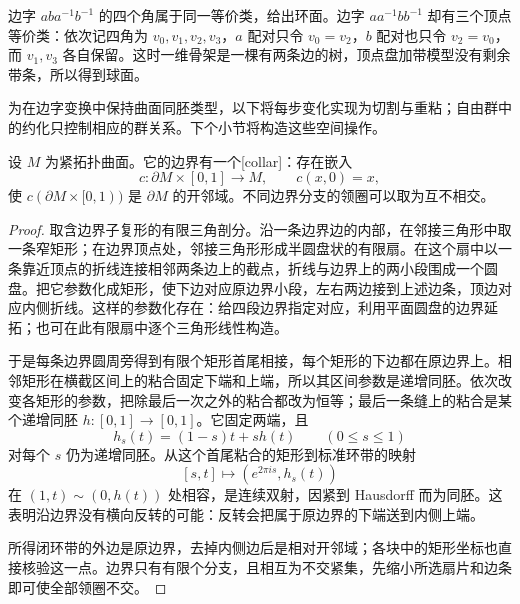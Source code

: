 \begin{example}\label{g1:ex:polygon-vertex-counts}
	边字 \(aba^{-1}b^{-1}\) 的四个角属于同一等价类，给出环面。边字 \(aa^{-1}bb^{-1}\) 却有三个顶点等价类：依次记四角为 \(v_0,v_1,v_2,v_3\)，\(a\) 配对只令 \(v_0=v_2\)，\(b\) 配对也只令 \(v_2=v_0\)，而 \(v_1,v_3\) 各自保留。这时一维骨架是一棵有两条边的树，顶点盘加带模型没有剩余带条，所以得到球面。
\end{example}

为在边字变换中保持曲面同胚类型，以下将每步变化实现为切割与重粘；自由群中的约化只控制相应的群关系。下个小节将构造这些空间操作。

\begin{proposition}\label{g1:prop:boundary-collar}
	设 \(M\) 为紧拓扑曲面。它的边界有一个[collar]：存在嵌入
	\[
		c:\partial M\times[0,1]\longrightarrow M,\qquad c(x,0)=x,
	\]
	使 \(c(\partial M\times[0,1))\) 是 \(\partial M\) 的开邻域。不同边界分支的领圈可以取为互不相交。
\end{proposition}
\begin{proof}
	取含边界子复形的有限三角剖分。沿一条边界边的内部，在邻接三角形中取一条窄矩形；在边界顶点处，邻接三角形形成半圆盘状的有限扇。在这个扇中以一条靠近顶点的折线连接相邻两条边上的截点，折线与边界上的两小段围成一个圆盘。把它参数化成矩形，使下边对应原边界小段，左右两边接到上述边条，顶边对应内侧折线。这样的参数化存在：给四段边界指定对应，利用平面圆盘的边界延拓；也可在此有限扇中逐个三角形线性构造。

	于是每条边界圆周旁得到有限个矩形首尾相接，每个矩形的下边都在原边界上。相邻矩形在横截区间上的粘合固定下端和上端，所以其区间参数是递增同胚。依次改变各矩形的参数，把除最后一次之外的粘合都改为恒等；最后一条缝上的粘合是某个递增同胚 \(h:[0,1]\to[0,1]\)。它固定两端，且
	\[
		h_s(t)=(1-s)t+s h(t)\qquad(0\le s\le1)
	\]
	对每个 \(s\) 仍为递增同胚。从这个首尾粘合的矩形到标准环带的映射
	\[
		[s,t]\longmapsto(e^{2\pi i s},h_s(t))
	\]
	在 \((1,t)\sim(0,h(t))\) 处相容，是连续双射，因紧到 Hausdorff 而为同胚。这表明沿边界没有横向反转的可能：反转会把属于原边界的下端送到内侧上端。

	所得闭环带的外边是原边界，去掉内侧边后是相对开邻域；各块中的矩形坐标也直接核验这一点。边界只有有限个分支，且相互为不交紧集，先缩小所选扇片和边条即可使全部领圈不交。
\end{proof}

